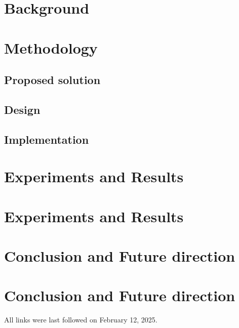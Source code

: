 \documentclass[
  a4paper,  %
  twoside,  %
  bibliography=totoc,
  headsepline,
  cleardoublepage=empty,
  parskip=half,
  draft=false
]{scrbook}
\begin{document}
\chapter{Background}
\label{chap:k3}

\let\cleardoublepage\clearpage
\chapter{Methodology}
\label{chap:k4}

\let\cleardoublepage\clearpage
\section{Proposed solution}
\label{chap:k5}

\let\cleardoublepage\clearpage
\section{Design}
\label{chap:k6}

\let\cleardoublepage\clearpage
\section{Implementation}
\label{chap:k7}

\let\cleardoublepage\clearpage
\chapter{Experiments and Results}

\let\cleardoublepage\clearpage
\chapter{Experiments and Results}
\label{chap:k8}

\let\cleardoublepage\clearpage
\chapter{Conclusion and Future direction}

\let\cleardoublepage\clearpage
\chapter{Conclusion and Future direction}
\label{chap:k9}



\printbibliography

All links were last followed on February 12, 2025.
\clearpage 
\appendix
\end{document}
